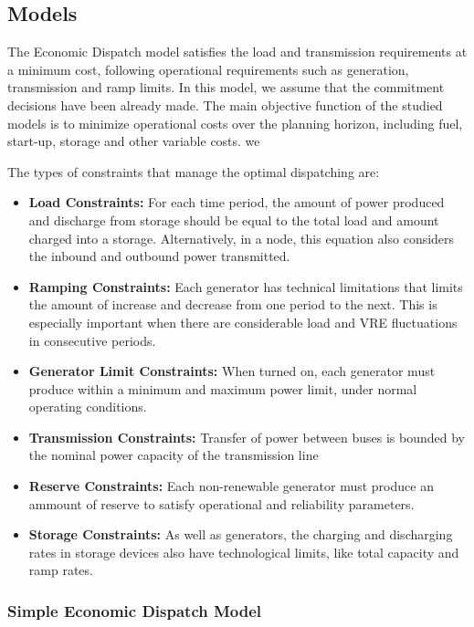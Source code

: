 \documentclass[12pt,LUDisStyle,twosided]{book}
\begin{document}
\subsection{Models}
The Economic Dispatch model satisfies the load and transmission requirements at a minimum cost, following operational requirements such as generation, transmission and ramp limits. In this model, we assume that the commitment decisions have been already made. The main objective function of the studied models is to minimize operational costs over the planning horizon, including fuel, start-up, storage and other variable costs.
we

The types of constraints that manage the optimal dispatching are:

\begin{itemize}
\item \textbf{Load Constraints:} For each time period, the amount of power produced and discharge from storage should be equal to the total load and amount charged into a storage. Alternatively, in a node, this equation also considers the inbound and outbound power transmitted.
\item \textbf{Ramping Constraints:}  Each generator has technical limitations that limits the amount of increase and decrease from one period to the next. This is especially important when there are considerable load and VRE fluctuations in consecutive periods.
\item \textbf{Generator Limit Constraints:} When turned on, each generator must produce within a minimum and maximum power limit, under normal operating conditions.
\item \textbf{Transmission Constraints:} Transfer of power between buses is bounded by the nominal power capacity of the transmission line
\item \textbf{Reserve Constraints:} Each non-renewable generator must produce an ammount of reserve to satisfy operational and reliability parameters.
\item \textbf{Storage Constraints:} As well as generators, the charging and discharging rates in storage devices also have technological limits, like total capacity and ramp rates.


\end{itemize}

\subsubsection{Simple Economic Dispatch Model}
\end{document}

